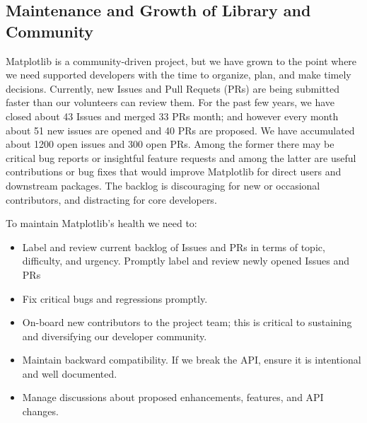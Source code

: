\documentclass[11pt,letterpaper]{article}  %
\begin{document}
\subsection{Maintenance and Growth of Library and Community}


Matplotlib is a community-driven project, but we have grown to the
point where we need supported developers with the time to organize,
plan, and make timely decisions.  Currently, new Issues and Pull
Requets (PRs) are being submitted faster than our volunteers can
review them.  For the past few years, we have closed about 43 Issues
and merged 33 PRs month; and however every month about 51 new issues
are opened and 40 PRs are proposed.  We have accumulated about 1200 open issues and
300 open PRs.  Among the former there may be critical bug reports or
insightful feature requests and among the latter are useful
contributions or bug fixes that would improve Matplotlib for direct
users and downstream packages.  The backlog is discouraging for new or
occasional contributors, and distracting for core developers.

To maintain Matplotlib's health we need to:

\begin{itemize}[noitemsep]
\item Label and review current backlog of Issues and PRs in terms of
  topic, difficulty, and urgency.  Promptly label and review newly
  opened Issues and PRs
\item Fix critical bugs and regressions promptly.
\item On-board new contributors to the project team; this is critical to
  sustaining and diversifying our developer community.
\item Maintain backward compatibility.  If we break the API, ensure it
  is intentional and well documented.
\item Manage discussions about proposed enhancements, features, and API changes.
\end{itemize}
\end{document}
